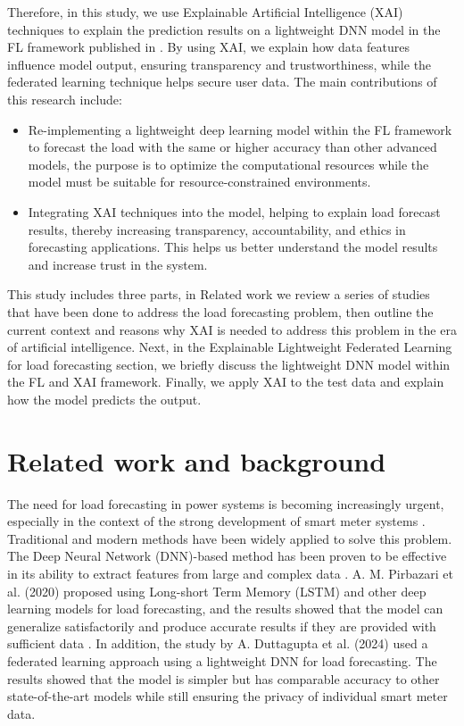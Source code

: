 \documentclass[11pt,a4paper]{article}
\begin{document}
Therefore, in this study, we use Explainable Artificial Intelligence (XAI) techniques to explain the prediction results on a lightweight DNN model in the FL framework published in \cite{duttagupta2023exploring}. By using XAI, we explain how data features influence model output, ensuring transparency and trustworthiness, while the federated learning technique helps secure user data. The main contributions of this research include: 
\begin{itemize}
    \item Re-implementing a lightweight deep learning model within the FL framework to forecast the load with the same or higher accuracy than other advanced models, the purpose is to optimize the computational resources while the model must be suitable for resource-constrained environments.
    
    \item Integrating XAI techniques into the model, helping to explain load forecast results, thereby increasing transparency, accountability, and ethics in forecasting applications. This helps us better understand the model results and increase trust in the system.
\end{itemize}

This study includes three parts, in Related work we review a series of studies that have been done to address the load forecasting problem, then outline the current context and reasons why XAI is needed to address this problem in the era of artificial intelligence. Next, in the Explainable Lightweight Federated Learning for load forecasting section, we briefly discuss the lightweight DNN model within the FL and XAI framework. Finally, we apply XAI to the test data and explain how the model predicts the output.

\section{Related work and background}
The need for load forecasting in power systems is becoming increasingly urgent, especially in the context of the strong development of smart meter systems \cite{athanasiadis2024review}. Traditional and modern methods have been widely applied to solve this problem. The Deep Neural Network (DNN)-based method has been proven to be effective in its ability to extract features from large and complex data \cite{taye2023understanding}. A. M. Pirbazari et al. (2020) proposed using Long-short Term Memory (LSTM) and other deep learning models for load forecasting, and the results showed that the model can generalize satisfactorily and produce accurate results if they are provided with sufficient data \cite{mehdipour2020short}. In addition, the study by A. Duttagupta et al. (2024) used a federated learning approach using a lightweight DNN for load forecasting. The results showed that the model is simpler but has comparable accuracy to other state-of-the-art models while still ensuring the privacy of individual smart meter data\cite{duttagupta2023exploring}. 
\end{document}
